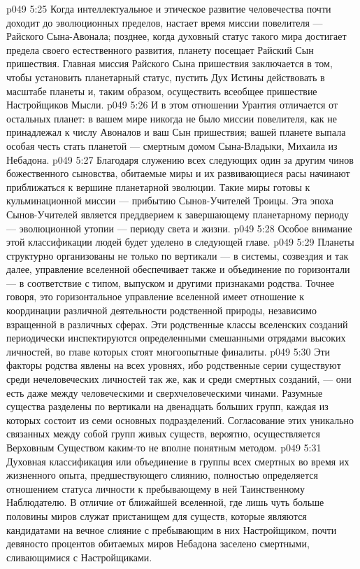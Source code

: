 \vs p049 5:25 Когда интеллектуальное и этическое развитие человечества почти доходит до эволюционных пределов, настает время миссии повелителя --- Райского Сына\hyp{}Авонала; позднее, когда духовный статус такого мира достигает предела своего естественного развития, планету посещает Райский Сын пришествия. Главная миссия Райского Сына пришествия заключается в том, чтобы установить планетарный статус, пустить Дух Истины действовать в масштабе планеты и, таким образом, осуществить всеобщее пришествие Настройщиков Мысли.
\vs p049 5:26 И в этом отношении Урантия отличается от остальных планет: в вашем мире никогда не было миссии повелителя, как не принадлежал к числу Авоналов и ваш Сын пришествия; вашей планете выпала особая честь стать планетой --- смертным домом Сына\hyp{}Владыки, Михаила из Небадона.
\vs p049 5:27 Благодаря служению всех следующих один за другим чинов божественного сыновства, обитаемые миры и их развивающиеся расы начинают приближаться к вершине планетарной эволюции. Такие миры готовы к кульминационной миссии --- прибытию Сынов\hyp{}Учителей Троицы. Эта эпоха Сынов\hyp{}Учителей является преддверием к завершающему планетарному периоду --- эволюционной утопии --- периоду света и жизни.
\vs p049 5:28 Особое внимание этой классификации людей будет уделено в следующей главе.
\vs p049 5:29 \bibnobreakspace {} Планеты структурно организованы не только по вертикали --- в системы, созвездия и так далее, управление вселенной обеспечивает также и объединение по горизонтали --- в соответствие с типом, выпуском и другими признаками родства. Точнее говоря, это горизонтальное управление вселенной имеет отношение к координации различной деятельности родственной природы, независимо взращенной в различных сферах. Эти родственные классы вселенских созданий периодически инспектируются определенными смешанными отрядами высоких личностей, во главе которых стоят многоопытные финалиты.
\vs p049 5:30 Эти факторы родства явлены на всех уровнях, ибо родственные серии существуют среди нечеловеческих личностей так же, как и среди смертных созданий, --- они есть даже между человеческими и сверхчеловеческими чинами. Разумные существа разделены по вертикали на двенадцать больших групп, каждая из которых состоит из семи основных подразделений. Согласование этих уникально связанных между собой групп живых существ, вероятно, осуществляется Верховным Существом каким\hyp{}то не вполне понятным методом.
\vs p049 5:31 \bibnobreakspace {} Духовная классификация или объединение в группы всех смертных во время их жизненного опыта, предшествующего слиянию, полностью определяется отношением статуса личности к пребывающему в ней Таинственному Наблюдателю. В отличие от ближайшей вселенной, где лишь чуть больше половины миров служат пристанищем для существ, которые являются кандидатами на вечное слияние с пребывающим в них Настройщиком, почти девяносто процентов обитаемых миров Небадона заселено смертными, сливающимися с Настройщиками.
